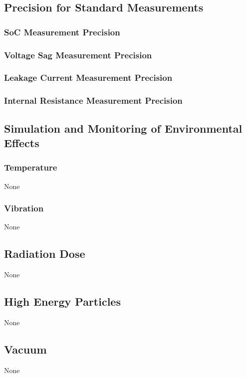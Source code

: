 \documentclass{article}
\begin{document}
\subsection{Precision for Standard Measurements}
\subsubsection{SoC Measurement Precision}
\subsubsection{Voltage Sag Measurement Precision}
\subsubsection{Leakage Current Measurement Precision}
\subsubsection{Internal Resistance Measurement Precision}
\subsection{Simulation and Monitoring of  Environmental Effects}
\subsubsection{Temperature}
None
\subsubsection{Vibration}
None
\subsection{Radiation Dose}
None
\subsection{High Energy Particles}
None
\subsection{Vacuum}
None
\end{document}

